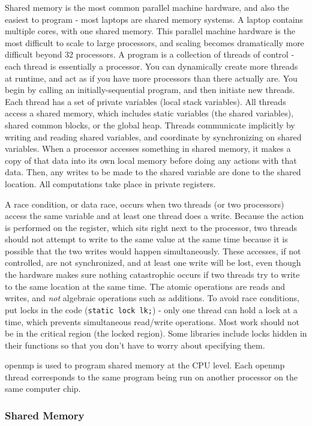 \documentclass[10pt]{article}
\begin{document}
\begin{flushleft}
Shared memory is the most common parallel machine hardware, and also the easiest to program - most laptops are shared memory systems. A laptop contains multiple cores, with one shared memory. This parallel machine hardware is the most difficult to scale to large processors, and scaling becomes dramatically more difficult beyond 32 processors. A program is a collection of threads of control - each thread is essentially a processor. You can dynamically create more threads at runtime, and act as if you have more processors than there actually are. You begin by calling an initially-sequential program, and then initiate new threads. Each thread has a set of private variables (local stack variables). All threads access a shared memory, which includes static variables (the shared variables), shared common blocks, or the global heap. Threads communicate implicitly by writing and reading shared variables, and coordinate by synchronizing on shared variables. When a processor accesses something in shared memory, it makes a copy of that data into its own local memory before doing any actions with that data. Then, any writes to be made to the shared variable are done to the shared location. All computations take place in private registers.

A race condition, or data race, occurs when two threads (or two processors) access the same variable and at least one thread does a write. Because the action is performed on the register, which sits right next to the processor, two threads should not attempt to write to the same value at the same time because it is possible that the two writes would happen simultaneously. These accesses, if not controlled, are not synchronized, and at least one write will be lost, even though the hardware makes sure nothing catastrophic occurs if two threads try to write to the same location at the same time. The atomic operations are reads and writes, and \textit{not} algebraic operations such as additions. To avoid race conditions, put locks in the code ({\tt static lock lk;}) - only one thread can hold a lock at a time, which prevents simultaneous read/write operations. Most work should not be in the critical region (the locked region). Some libraries include locks hidden in their functions so that you don't have to worry about specifying them.

\gls{openmp} is used to program shared memory at the CPU level. Each \gls{openmp} thread corresponds to the same program being run on another processor on the same computer chip.

\subsubsection{Shared Memory}


\end{flushleft}
\end{document}
